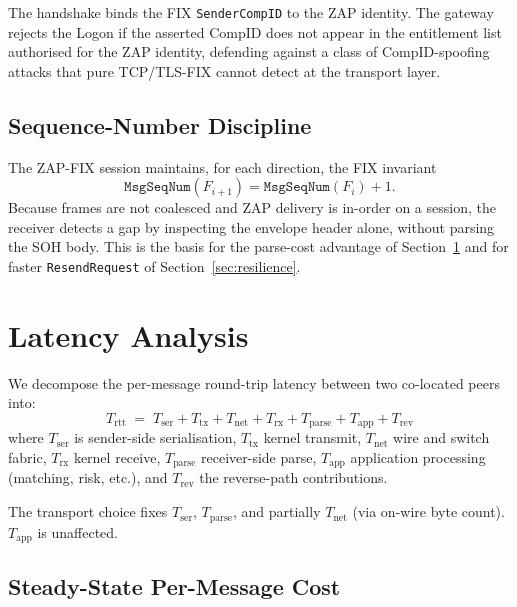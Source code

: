 \documentclass[11pt,a4paper]{article}
\begin{document}
The handshake binds the FIX \texttt{SenderCompID} to the ZAP
identity. The gateway rejects the Logon if the asserted CompID does
not appear in the entitlement list authorised for the ZAP identity,
defending against a class of CompID-spoofing attacks that pure
TCP/TLS-FIX cannot detect at the transport layer.

\subsection{Sequence-Number Discipline}

The ZAP-FIX session maintains, for each direction, the FIX
invariant
\begin{equation}
  \texttt{MsgSeqNum}(F_{i+1}) = \texttt{MsgSeqNum}(F_i) + 1.
  \label{eq:seqnum}
\end{equation}
Because frames are not coalesced and ZAP delivery is in-order on a
session, the receiver detects a gap by inspecting the envelope
header alone, without parsing the SOH body. This is the basis for
the parse-cost advantage of Section~\ref{sec:latency} and for
faster \texttt{ResendRequest} of Section~\ref{sec:resilience}.

\section{Latency Analysis}
\label{sec:latency}

We decompose the per-message round-trip latency between two co-located
peers into:
\begin{equation}
  T_{\mathrm{rtt}} \;=\; T_{\mathrm{ser}} + T_{\mathrm{tx}}
                       + T_{\mathrm{net}}
                       + T_{\mathrm{rx}} + T_{\mathrm{parse}}
                       + T_{\mathrm{app}} + T_{\mathrm{rev}}
  \label{eq:budget}
\end{equation}
where $T_{\mathrm{ser}}$ is sender-side serialisation,
$T_{\mathrm{tx}}$ kernel transmit, $T_{\mathrm{net}}$ wire and
switch fabric, $T_{\mathrm{rx}}$ kernel receive, $T_{\mathrm{parse}}$
receiver-side parse, $T_{\mathrm{app}}$ application processing
(matching, risk, etc.), and $T_{\mathrm{rev}}$ the reverse-path
contributions.

The transport choice fixes
$T_{\mathrm{ser}}$, $T_{\mathrm{parse}}$, and partially
$T_{\mathrm{net}}$ (via on-wire byte count). $T_{\mathrm{app}}$ is
unaffected.

\subsection{Steady-State Per-Message Cost}
\end{document}
